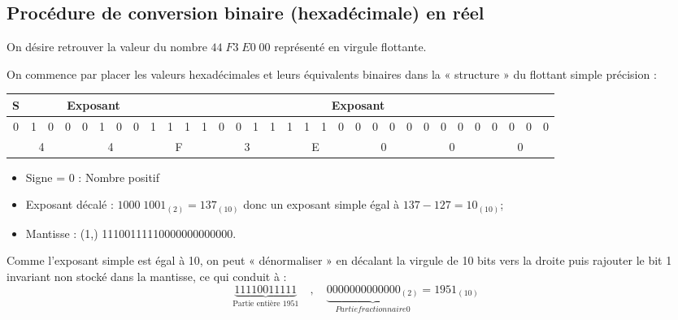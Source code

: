 \documentclass[10pt,fleqn]{article} %
\begin{document}
\subsection{Procédure de conversion binaire (hexadécimale) en réel }

On désire retrouver la valeur du nombre $44\;F3\; E0\; 00$ représenté en virgule flottante.

On commence par placer les valeurs hexadécimales et leurs équivalents binaires dans la « structure » du flottant simple précision :


\footnotesize{
\begin{center}
\begin{tabular}{|c|c|c|c|c|c|c|c|c|c|c|c|c|c|c|c|c|c|c|c|c|c|c|c|c|c|c|c|c|c|c|c|}
\hline
S & \multicolumn{8}{c|}{Exposant} & \multicolumn{23}{c|}{Exposant} \\
\hline
0 & 1 & 0 & 0 & 0 & 1 & 0 & 0 & 1 & 1 & 1 & 1 & 0 & 0 & 1 & 1 & 
1 & 1 & 1 & 0 & 0 & 0 & 0 & 0 & 0 & 0 & 0 & 0 & 0 & 0 & 0 & 0 \\
\hline
\multicolumn{4}{|c|}{4} & \multicolumn{4}{c|}{4} & \multicolumn{4}{c|}{F} & 
\multicolumn{4}{|c|}{3} & \multicolumn{4}{|c|}{E} & \multicolumn{4}{c|}{0} & 
\multicolumn{4}{c|}{0} & \multicolumn{4}{|c|}{0} \\
\hline
\end{tabular}
\end{center}}


\begin{itemize}
\item Signe = 0 : Nombre positif
\item Exposant décalé : $1000\;1001_{(2)} = 137_{(10)}$ donc un exposant simple égal à $137 -127 = 10 _{(10)}$;
\item Mantisse : (1,) 11100111110000000000000. 
\end{itemize}

Comme l’exposant simple est égal à 10, on peut « dénormaliser » en décalant la virgule de 10 bits vers la droite puis rajouter le bit 1 invariant non stocké dans la mantisse, ce qui conduit à :
$$
\underbrace{11110011111}_{\text{Partie entière 1951}} \quad , \quad \underbrace{0000000000000_{(2)}}_{Partie fractionnaire 0} =  1951_{(10)}
$$
\end{document}
